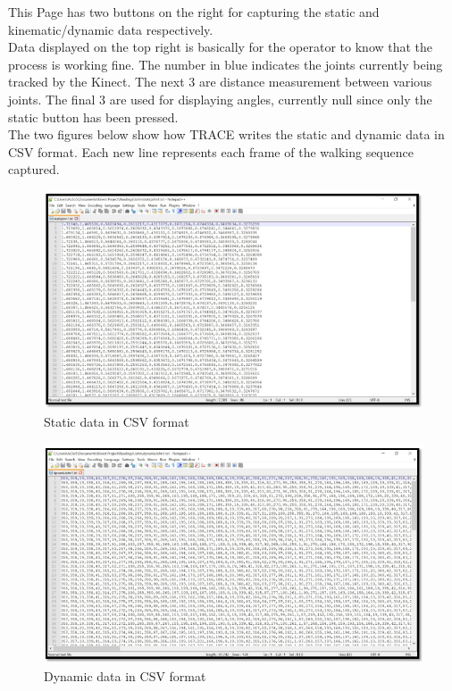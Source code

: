 This Page has two buttons on the right for capturing the static and kinematic/dynamic data respectively. \\
Data displayed on the top right is basically for the operator to know that the process is working fine. The number in blue indicates the joints currently being tracked by the Kinect. The next 3 are distance measurement between various joints. The final 3 are used for displaying angles, currently null since only the static button has been pressed.\\
The two figures below show how TRACE writes the static and dynamic data in CSV format. Each new line represents each frame of the walking sequence captured.\\
\begin{figure}[h]
\centering
\includegraphics[scale=0.7]{static.png}
\caption{Static data in CSV format}
\end{figure}

\begin{figure}[h]
\centering
\includegraphics[scale=0.7]{dynamic.png}
\caption{Dynamic data in CSV format}
\end{figure}










